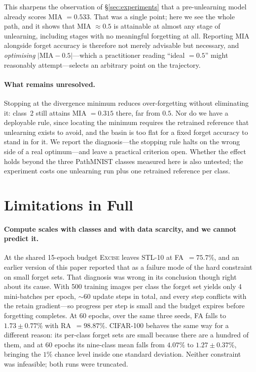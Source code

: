 \documentclass{article}
\newcommand{\ours}{\textsc{Excise}}
\theoremstyle{remark}
\theoremstyle{plain}
\begin{document}
This sharpens the observation of \S\ref{sec:experiments} that a pre-unlearning
model already scores MIA $=0.533$. That was a single point; here we see the
whole path, and it shows that MIA $\approx 0.5$ is attainable at almost any
stage of unlearning, including stages with no meaningful forgetting at all.
Reporting MIA alongside forget accuracy is therefore not merely advisable but
necessary, and \emph{optimising} $|\mathrm{MIA}-0.5|$---which a practitioner
reading ``ideal $=0.5$'' might reasonably attempt---selects an arbitrary point
on the trajectory.

\paragraph{What remains unresolved.}
Stopping at the divergence minimum reduces over-forgetting without eliminating
it: class~2 still attains MIA $=0.315$ there, far from $0.5$. Nor do we have a
deployable rule, since locating the minimum requires the retrained reference
that unlearning exists to avoid, and the basin is too flat for a fixed forget
accuracy to stand in for it. We report the diagnosis---the stopping rule halts
on the wrong side of a real optimum---and leave a practical criterion open.
Whether the effect holds beyond the three PathMNIST classes measured here is
also untested; the experiment costs one unlearning run plus one retrained
reference per class.

\section{Limitations in Full}\label{app:limitations}

\paragraph{Compute scales with classes and with data scarcity, and we cannot
predict it.} At the shared 15-epoch budget \ours{} leaves STL-10 at
FA~$=75.7\%$, and an earlier version of this paper reported that as a failure
mode of the hard constraint on small forget sets. That diagnosis was wrong in
its conclusion though right about its cause. With 500 training images per class
the forget set yields only 4 mini-batches per epoch, ${\sim}60$ update steps in
total, and every step conflicts with the retain gradient---so progress per step
is small and the budget expires before forgetting completes. At 60 epochs, over
the same three seeds, FA falls to $1.73 \pm 0.77\%$ with RA~$=98.87\%$. CIFAR-100
behaves the same way for a different reason: its per-class forget sets are small
because there are a hundred of them, and at 60 epochs its nine-class mean falls
from $4.07\%$ to $1.27 \pm 0.37\%$, bringing the $1\%$ chance level inside one
standard deviation. Neither constraint was infeasible; both runs were truncated.
\end{document}
